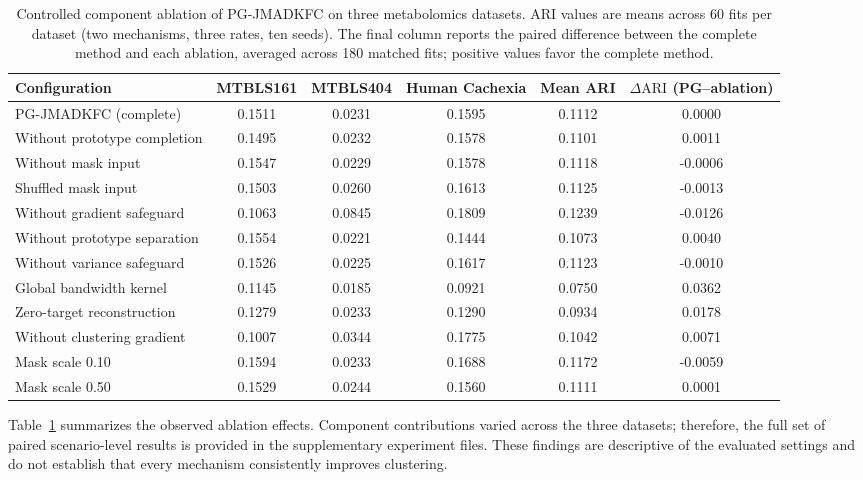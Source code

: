 \begin{table}[t]
\centering
\caption{Controlled component ablation of PG-JMADKFC on three metabolomics datasets. ARI values are means across 60 fits per dataset (two mechanisms, three rates, ten seeds). The final column reports the paired difference between the complete method and each ablation, averaged across 180 matched fits; positive values favor the complete method.}
\label{tab:pg_component_ablation}
\scriptsize
\setlength{\tabcolsep}{4pt}
\begin{tabular}{lccccc}
\toprule
Configuration & MTBLS161 & MTBLS404 & Human Cachexia & Mean ARI & $\Delta\mathrm{ARI}$ (PG--ablation) \\
\midrule
PG-JMADKFC (complete) & 0.1511 & 0.0231 & 0.1595 & 0.1112 & 0.0000 \\
Without prototype completion & 0.1495 & 0.0232 & 0.1578 & 0.1101 & 0.0011 \\
Without mask input & 0.1547 & 0.0229 & 0.1578 & 0.1118 & -0.0006 \\
Shuffled mask input & 0.1503 & 0.0260 & 0.1613 & 0.1125 & -0.0013 \\
Without gradient safeguard & 0.1063 & 0.0845 & 0.1809 & 0.1239 & -0.0126 \\
Without prototype separation & 0.1554 & 0.0221 & 0.1444 & 0.1073 & 0.0040 \\
Without variance safeguard & 0.1526 & 0.0225 & 0.1617 & 0.1123 & -0.0010 \\
Global bandwidth kernel & 0.1145 & 0.0185 & 0.0921 & 0.0750 & 0.0362 \\
Zero-target reconstruction & 0.1279 & 0.0233 & 0.1290 & 0.0934 & 0.0178 \\
Without clustering gradient & 0.1007 & 0.0344 & 0.1775 & 0.1042 & 0.0071 \\
Mask scale 0.10 & 0.1594 & 0.0233 & 0.1688 & 0.1172 & -0.0059 \\
Mask scale 0.50 & 0.1529 & 0.0244 & 0.1560 & 0.1111 & 0.0001 \\
\bottomrule
\end{tabular}
\end{table}

Table~\ref{tab:pg_component_ablation} summarizes the observed ablation effects. Component contributions varied across the three datasets; therefore, the full set of paired scenario-level results is provided in the supplementary experiment files. These findings are descriptive of the evaluated settings and do not establish that every mechanism consistently improves clustering.

